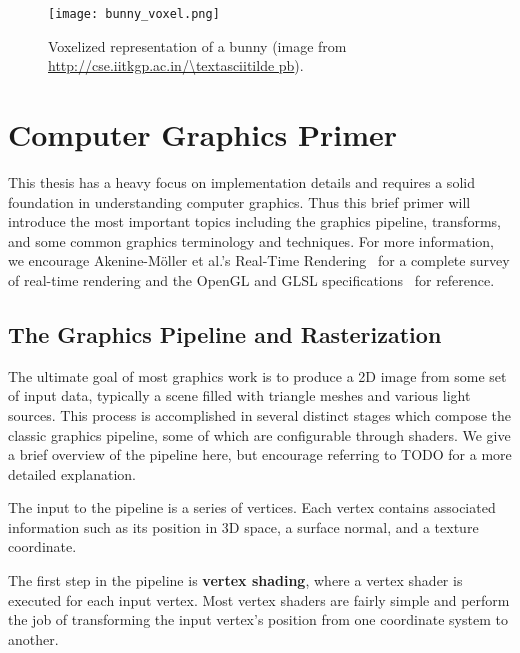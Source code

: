 
\begin{figure}[h]
\centering
\texttt{[image: bunny\_voxel.png]}
\caption{Voxelized representation of a bunny (image from \url{http://cse.iitkgp.ac.in/\textasciitilde pb}).}
\label{fig:bunnyvoxel}
\end{figure}

\section{Computer Graphics Primer}
This thesis has a heavy focus on implementation details and requires a solid foundation in understanding computer graphics. Thus this brief primer will introduce the most important topics including the graphics pipeline, transforms, and some common graphics terminology and techniques. For more information, we encourage Akenine-M{\"o}ller et al.'s Real-Time Rendering~\cite{moller2008rtr} for a complete survey of real-time rendering and the OpenGL and GLSL specifications~\cite{opengl45spec,glsl45spec} for reference.

\subsection{The Graphics Pipeline and Rasterization}
The ultimate goal of most graphics work is to produce a 2D image from some set of input data, typically a scene filled with triangle meshes and various light sources. This process is accomplished in several distinct stages which compose the classic graphics pipeline, some of which are configurable through shaders. We give a brief overview of the pipeline here, but encourage referring to TODO for a more detailed explanation.

The input to the pipeline is a series of vertices. Each vertex contains associated information such as its position in 3D space, a surface normal, and a texture coordinate.

The first step in the pipeline is \textbf{vertex shading}, where a vertex shader is executed for each input vertex. Most vertex shaders are fairly simple and perform the job of transforming the input vertex's position from one coordinate system to another.

